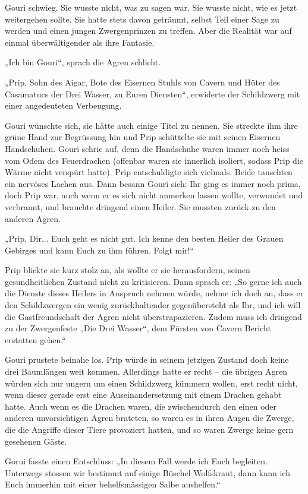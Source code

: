 Gouri schwieg. Sie wusste nicht, was zu sagen war. Sie wusste nicht, wie es jetzt weitergehen sollte. Sie hatte stets davon geträumt, selbst Teil einer Sage zu werden und einen jungen Zwergenprinzen zu treffen. Aber die Realität war auf einmal überwältigender als ihre Fantasie.

„Ich bin Gouri“, sprach die Agren schlicht.

„Prip, Sohn des Aigar, Bote des Eisernen Stuhls von Cavern und Hüter des Casamatucs der Drei Wasser, zu Euren Diensten“, erwiderte der Schildzwerg mit einer angedeuteten Verbeugung.

Gouri wünschte sich, sie hätte auch einige Titel zu nennen. Sie streckte ihm ihre grüne Hand zur Begrüssung hin und Prip schüttelte sie mit seinen Eisernen Handschuhen. Gouri schrie auf, denn die Handschuhe waren immer noch heiss vom Odem des Feuerdrachen (offenbar waren sie innerlich isoliert, sodass Prip die Wärme nicht verspürt hatte). Prip entschuldigte sich vielmals. Beide tauschten ein nervöses Lachen aus. Dann besann Gouri sich: Ihr ging es immer noch prima, doch Prip war, auch wenn er es sich nicht anmerken lassen wollte, verwundet und verbrannt, und brauchte dringend einen Heiler. Sie mussten zurück zu den anderen Agren.

„Prip, Dir... Euch geht es nicht gut. Ich kenne den besten Heiler des Grauen Gebirges und kann Euch zu ihm führen. Folgt mir!“

Prip blickte sie kurz stolz an, als wollte er sie herausfordern, seinen gesundheitlichen Zustand nicht zu kritisieren. Dann sprach er: „So gerne ich auch die Dienste dieses Heilers in Anspruch nehmen würde, nehme ich doch an, dass er den Schildzwergen ein wenig zurückhaltender gegenübersteht als Ihr, und ich will die Gastfreundschaft der Agren nicht überstrapazieren. Zudem muss ich dringend zu der Zwergenfeste „Die Drei Wasser“, dem Fürsten von Cavern Bericht erstatten gehen.“

Gouri prustete beinahe los. Prip würde in seinem jetzigen Zustand doch keine drei Baumlängen weit kommen. Allerdings hatte er recht – die übrigen Agren würden sich nur ungern um einen Schildzwerg kümmern wollen, erst recht nicht, wenn dieser gerade erst eine Auseinandersetzung mit einem Drachen gehabt hatte. Auch wenn es die Drachen waren, die zwischendurch den einen oder anderen unvorsichtigen Agren brateten, so waren es in ihren Augen die Zwerge, die die Angriffe dieser Tiere provoziert hatten, und so waren Zwerge keine gern gesehenen Gäste.

Gorui fasste einen Entschluss: „In diesem Fall werde ich Euch begleiten. Unterwegs stossen wir bestimmt auf einige Büschel Wolfskraut, dann kann ich Euch immerhin mit einer behelfsmässigen Salbe aushelfen.“

